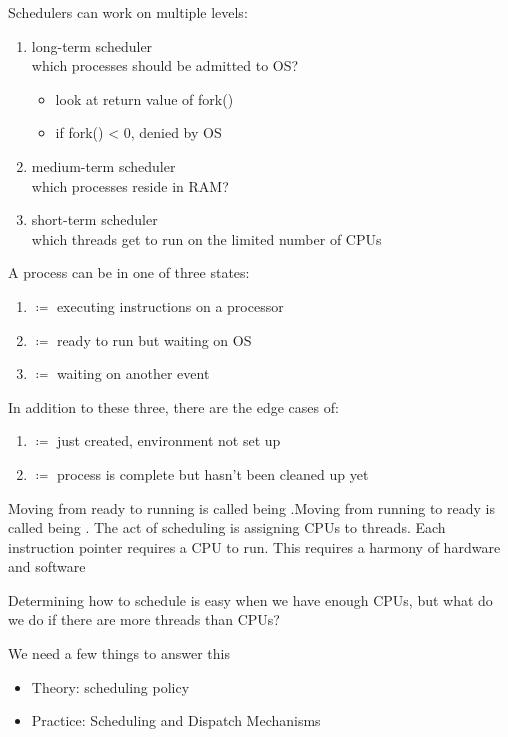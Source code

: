 \documentclass[../../lecture_notes.tex]{subfiles}
\begin{document}
Schedulers can work on multiple levels:
\begin{enumerate}
\item long-term scheduler \\
	which processes should be admitted to OS?
	\begin{itemize}
	\item look at return value of fork()
	\item if fork() < 0, denied by OS
	\end{itemize}
\item medium-term scheduler \\
	which processes reside in RAM?
\item short-term scheduler \\
	which threads get to run on the limited number of CPUs
\end{enumerate}


A process can be in one of three states:
\begin{enumerate}
\item {} $\coloneqq$ executing instructions on a processor
\item {} $\coloneqq$ ready to run but waiting on OS
\item {} $\coloneqq$ waiting on another event
\end{enumerate}


In addition to these three, there are the edge cases of:
\begin{enumerate}
\item {} $\coloneqq$ just created, environment not set up
\item {} $\coloneqq$ process is complete but hasn’t been cleaned up yet 
\end{enumerate}

Moving from ready to running is called being .Moving from running to ready is called being . The act of scheduling is assigning CPUs to threads. Each instruction pointer requires a CPU to run. This requires a harmony of hardware and software
    

Determining how to schedule is easy when we have enough CPUs, but what do we do if there are more threads than CPUs?

We need a few things to answer this
\begin{itemize}
\item Theory: scheduling policy
\item Practice: Scheduling and Dispatch Mechanisms
\end{itemize}
\end{document}
